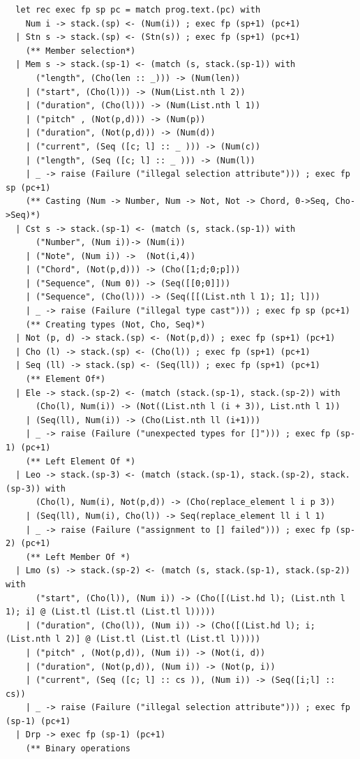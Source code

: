 \documentclass[12pt,A4]{book}
\begin{document}
\begin{verbatim}
  let rec exec fp sp pc = match prog.text.(pc) with
    Num i -> stack.(sp) <- (Num(i)) ; exec fp (sp+1) (pc+1)
  | Stn s -> stack.(sp) <- (Stn(s)) ; exec fp (sp+1) (pc+1)
    (** Member selection*)
  | Mem s -> stack.(sp-1) <- (match (s, stack.(sp-1)) with 
      ("length", (Cho(len :: _))) -> (Num(len))
    | ("start", (Cho(l))) -> (Num(List.nth l 2))
    | ("duration", (Cho(l))) -> (Num(List.nth l 1))
    | ("pitch" , (Not(p,d))) -> (Num(p))
    | ("duration", (Not(p,d))) -> (Num(d))
    | ("current", (Seq ([c; l] :: _ ))) -> (Num(c))
    | ("length", (Seq ([c; l] :: _ ))) -> (Num(l))
    | _ -> raise (Failure ("illegal selection attribute"))) ; exec fp sp (pc+1)
    (** Casting (Num -> Number, Num -> Not, Not -> Chord, 0->Seq, Cho->Seq)*)
  | Cst s -> stack.(sp-1) <- (match (s, stack.(sp-1)) with 
      ("Number", (Num i))-> (Num(i))
    | ("Note", (Num i)) ->  (Not(i,4))
    | ("Chord", (Not(p,d))) -> (Cho([1;d;0;p]))
    | ("Sequence", (Num 0)) -> (Seq([[0;0]]))
    | ("Sequence", (Cho(l))) -> (Seq([[(List.nth l 1); 1]; l]))
    | _ -> raise (Failure ("illegal type cast"))) ; exec fp sp (pc+1)
    (** Creating types (Not, Cho, Seq)*)
  | Not (p, d) -> stack.(sp) <- (Not(p,d)) ; exec fp (sp+1) (pc+1)
  | Cho (l) -> stack.(sp) <- (Cho(l)) ; exec fp (sp+1) (pc+1)
  | Seq (ll) -> stack.(sp) <- (Seq(ll)) ; exec fp (sp+1) (pc+1)
    (** Element Of*)
  | Ele -> stack.(sp-2) <- (match (stack.(sp-1), stack.(sp-2)) with 
      (Cho(l), Num(i)) -> (Not((List.nth l (i + 3)), List.nth l 1))
    | (Seq(ll), Num(i)) -> (Cho(List.nth ll (i+1)))
    | _ -> raise (Failure ("unexpected types for []"))) ; exec fp (sp-1) (pc+1)
    (** Left Element Of *)
  | Leo -> stack.(sp-3) <- (match (stack.(sp-1), stack.(sp-2), stack.(sp-3)) with 
      (Cho(l), Num(i), Not(p,d)) -> (Cho(replace_element l i p 3))
    | (Seq(ll), Num(i), Cho(l)) -> Seq(replace_element ll i l 1)
    | _ -> raise (Failure ("assignment to [] failed"))) ; exec fp (sp-2) (pc+1)
    (** Left Member Of *)
  | Lmo (s) -> stack.(sp-2) <- (match (s, stack.(sp-1), stack.(sp-2)) with 
      ("start", (Cho(l)), (Num i)) -> (Cho([(List.hd l); (List.nth l 1); i] @ (List.tl (List.tl (List.tl l)))))
    | ("duration", (Cho(l)), (Num i)) -> (Cho([(List.hd l); i; (List.nth l 2)] @ (List.tl (List.tl (List.tl l)))))
    | ("pitch" , (Not(p,d)), (Num i)) -> (Not(i, d))
    | ("duration", (Not(p,d)), (Num i)) -> (Not(p, i))
    | ("current", (Seq ([c; l] :: cs )), (Num i)) -> (Seq([i;l] :: cs))
    | _ -> raise (Failure ("illegal selection attribute"))) ; exec fp (sp-1) (pc+1)
  | Drp -> exec fp (sp-1) (pc+1)
    (** Binary operations

\end{verbatim}
\end{document}
